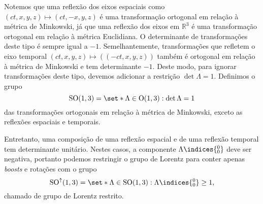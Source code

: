 Notemos que uma reflexão dos eixos espaciais como \((ct, x,y,z) \mapsto (ct, -x, y, z)\) é uma transformação ortogonal em relação à métrica de Minkowski, já que uma reflexão dos eixos em \(\mathbb{R}^3\) é uma transformação ortogonal em relação à métrica Euclidiana. O determinante de transformações deste tipo é sempre igual a \(-1\). Semelhantemente, transformações que refletem o eixo temporal \((ct, x,y, z) \mapsto ((-ct, x,y, z))\) também é ortogonal em relação à métrica de Minkowski e tem determinante \(-1\). Deste modo, para ignorar transformações deste tipo, devemos adicionar a restrição \(\det \Lambda = 1\). Definimos o grupo
\begin{equation*}
    \mathrm{SO}(1,3) = \set*{\Lambda \in \mathrm{O}(1,3) : \det \Lambda = 1}
\end{equation*}
das transformações ortogonais em relação à métrica de Minkowski, exceto as reflexões espaciais e temporais.

Entretanto, uma composição de uma reflexão espacial e de uma reflexão temporal tem determinante unitário. Nestes casos, a componente \(\Lambda\indices{^0_0}\) deve ser negativa, portanto podemos restringir o grupo de Lorentz para conter apenas \textit{boosts} e rotações com o grupo
\begin{equation*}
    \mathrm{SO}^\uparrow(1,3) = \set*{\Lambda \in \mathrm{SO}(1,3) : \Lambda\indices{^0_0} \geq 1},
\end{equation*}
chamado de grupo de Lorentz restrito.

